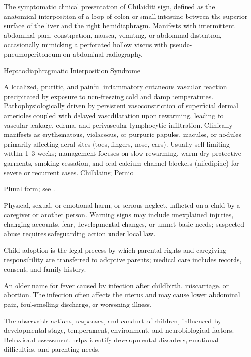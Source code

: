  The symptomatic clinical presentation of Chilaiditi sign, defined as the anatomical interposition of a loop of colon or small intestine between the superior surface of the liver and the right hemidiaphragm. Manifests with intermittent abdominal pain, constipation, nausea, vomiting, or abdominal distention, occasionally mimicking a perforated hollow viscus with pseudo-pneumoperitoneum on abdominal radiography.

\synonyms
Hepatodiaphragmatic Interposition Syndrome

 A localized, pruritic, and painful inflammatory cutaneous vascular reaction precipitated by exposure to non-freezing cold and damp temperatures. Pathophysiologically driven by persistent vasoconstriction of superficial dermal arterioles coupled with delayed vasodilatation upon rewarming, leading to vascular leakage, edema, and perivascular lymphocytic infiltration. Clinically manifests as erythematous, violaceous, or purpuric papules, macules, or nodules primarily affecting acral sites (toes, fingers, nose, ears). Usually self-limiting within 1--3 weeks; management focuses on slow rewarming, warm dry protective garments, smoking cessation, and oral calcium channel blockers (nifedipine) for severe or recurrent cases.
\synonyms
Chilblains; Pernio

 Plural form; see .

 Physical, sexual, or emotional harm, or serious neglect, inflicted on a child by a caregiver or another person. Warning signs may include unexplained injuries, changing accounts, fear, developmental changes, or unmet basic needs; suspected abuse requires safeguarding action under local law.

 Child adoption is the legal process by which parental rights and caregiving responsibility are transferred to adoptive parents; medical care includes records, consent, and family history.

 An older name for fever caused by infection after childbirth, miscarriage, or abortion. The infection often affects the uterus and may cause lower abdominal pain, foul-smelling discharge, or worsening illness.

 The observable actions, responses, and conduct of children, influenced by developmental stage, temperament, environment, and neurobiological factors. Behavioral assessment helps identify developmental disorders, emotional difficulties, and parenting needs.


